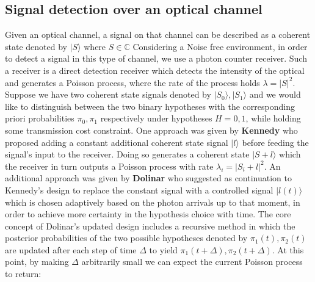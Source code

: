 \documentclass[12pt]{article}
\begin{document}
\begin{center}
\section*{Signal detection over an optical channel}
\end{center}
\vspace{0.5cm}
Given an optical channel, a signal on that channel can be described as a coherent state denoted by $|S\rangle$ where  $S\in\mathbb{C}$  
\newline
\newline
Considering a Noise free environment, in order to detect a signal in this type of channel, 
we use a photon counter receiver. Such a receiver is a direct detection receiver which detects 
the intensity of the optical and generates a Poisson process, where the rate of the process holds $\lambda = |S|^2$.
\newline
\newline
Suppose we have two coherent state signals denoted by $|S_0\rangle, |S_1\rangle$ and we would like to distinguish between the two 
binary hypotheses with the corresponding priori probabilities $\pi_0, \pi_1$ respectively under hypotheses $H=0,1$, 
while holding some transmission cost constraint. 
\newline
\newline
One approach was given by \textbf{Kennedy} who proposed adding a constant additional coherent state signal $|l\rangle$ 
before feeding the signal’s input to the receiver. Doing so generates a coherent state $|S+l\rangle$ which 
the receiver in turn outputs a Poisson process with rate $\lambda_i=|S_i+l|^2$.
\newline
\newline
An additional approach was given by \textbf{Dolinar} who suggested as continuation to Kennedy’s design to replace the constant 
signal with a controlled signal $|l(t)\rangle$ which is chosen adaptively based on the photon arrivals up to that moment, 
in order to achieve more certainty in the hypothesis choice with time.
\newline
\newline
The core concept of Dolinar’s updated design includes a recursive method in which the posterior probabilities of 
the two possible hypotheses denoted by $\pi_1(t), \pi_2(t)$ are updated after each step of time $\Delta$ to yield 
$\pi_1(t+\Delta), \pi_2(t+\Delta)$. 
\newline
\newline
At this point, by making $\Delta$ arbitrarily small we can expect the current Poisson process to return:
\end{document}
